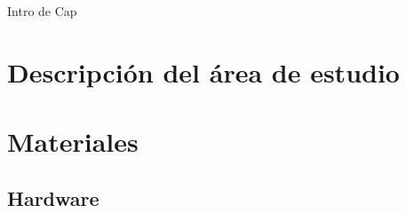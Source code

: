 \documentclass[12pt,twoside]{reedthesis}
\begin{document}
Intro de Cap

\hypertarget{descripcion-del-area-de-estudio}{%
\section{Descripción del área de estudio}\label{descripcion-del-area-de-estudio}}

\hypertarget{materiales}{%
\section{Materiales}\label{materiales}}

\hypertarget{hardware}{%
\subsection{Hardware}\label{hardware}}
\end{document}

